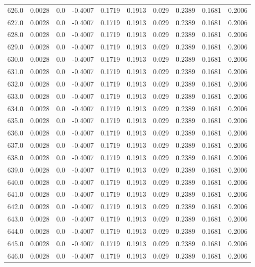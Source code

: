\begin{longtable}{lrrrrrrrrr}
626.0 & 0.0028 & 0.0 & -0.4007 & 0.1719 & 0.1913 & 0.029 & 0.2389 & 0.1681 & 0.2006 \\
627.0 & 0.0028 & 0.0 & -0.4007 & 0.1719 & 0.1913 & 0.029 & 0.2389 & 0.1681 & 0.2006 \\
628.0 & 0.0028 & 0.0 & -0.4007 & 0.1719 & 0.1913 & 0.029 & 0.2389 & 0.1681 & 0.2006 \\
629.0 & 0.0028 & 0.0 & -0.4007 & 0.1719 & 0.1913 & 0.029 & 0.2389 & 0.1681 & 0.2006 \\
630.0 & 0.0028 & 0.0 & -0.4007 & 0.1719 & 0.1913 & 0.029 & 0.2389 & 0.1681 & 0.2006 \\
631.0 & 0.0028 & 0.0 & -0.4007 & 0.1719 & 0.1913 & 0.029 & 0.2389 & 0.1681 & 0.2006 \\
632.0 & 0.0028 & 0.0 & -0.4007 & 0.1719 & 0.1913 & 0.029 & 0.2389 & 0.1681 & 0.2006 \\
633.0 & 0.0028 & 0.0 & -0.4007 & 0.1719 & 0.1913 & 0.029 & 0.2389 & 0.1681 & 0.2006 \\
634.0 & 0.0028 & 0.0 & -0.4007 & 0.1719 & 0.1913 & 0.029 & 0.2389 & 0.1681 & 0.2006 \\
635.0 & 0.0028 & 0.0 & -0.4007 & 0.1719 & 0.1913 & 0.029 & 0.2389 & 0.1681 & 0.2006 \\
636.0 & 0.0028 & 0.0 & -0.4007 & 0.1719 & 0.1913 & 0.029 & 0.2389 & 0.1681 & 0.2006 \\
637.0 & 0.0028 & 0.0 & -0.4007 & 0.1719 & 0.1913 & 0.029 & 0.2389 & 0.1681 & 0.2006 \\
638.0 & 0.0028 & 0.0 & -0.4007 & 0.1719 & 0.1913 & 0.029 & 0.2389 & 0.1681 & 0.2006 \\
639.0 & 0.0028 & 0.0 & -0.4007 & 0.1719 & 0.1913 & 0.029 & 0.2389 & 0.1681 & 0.2006 \\
640.0 & 0.0028 & 0.0 & -0.4007 & 0.1719 & 0.1913 & 0.029 & 0.2389 & 0.1681 & 0.2006 \\
641.0 & 0.0028 & 0.0 & -0.4007 & 0.1719 & 0.1913 & 0.029 & 0.2389 & 0.1681 & 0.2006 \\
642.0 & 0.0028 & 0.0 & -0.4007 & 0.1719 & 0.1913 & 0.029 & 0.2389 & 0.1681 & 0.2006 \\
643.0 & 0.0028 & 0.0 & -0.4007 & 0.1719 & 0.1913 & 0.029 & 0.2389 & 0.1681 & 0.2006 \\
644.0 & 0.0028 & 0.0 & -0.4007 & 0.1719 & 0.1913 & 0.029 & 0.2389 & 0.1681 & 0.2006 \\
645.0 & 0.0028 & 0.0 & -0.4007 & 0.1719 & 0.1913 & 0.029 & 0.2389 & 0.1681 & 0.2006 \\
646.0 & 0.0028 & 0.0 & -0.4007 & 0.1719 & 0.1913 & 0.029 & 0.2389 & 0.1681 & 0.2006 \\

\end{longtable}
